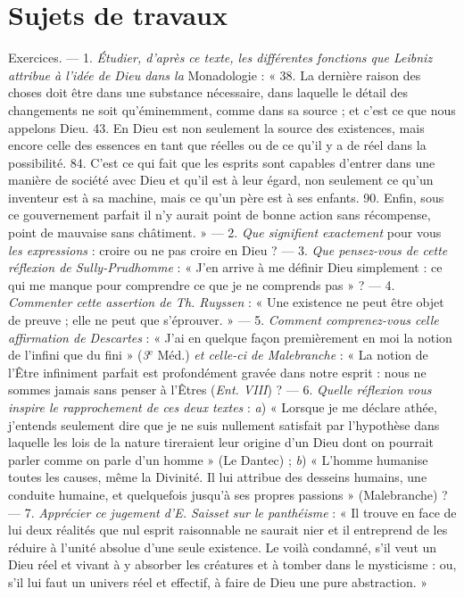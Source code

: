 \section{Sujets de travaux}%

Exercices. — 1. {\it Étudier, d'après ce texte, les différentes fonctions que
Leibniz attribue à l’idée de Dieu dans la} Monadologie : « 38. La dernière
raison des choses doit être dans une substance nécessaire, dans laquelle le
détail des changements ne soit qu’éminemment, comme dans sa source ; et
c’est ce que nous appelons Dieu. 43. En Dieu est non seulement la source
des existences, mais encore celle des essences en tant que réelles ou de ce
qu’il y a de réel dans la possibilité. 84. C’est ce qui fait que les esprits
sont capables d'entrer dans une manière de société avec Dieu et qu’il est à
leur égard, non seulement ce qu’un inventeur est à sa machine, mais ce
qu’un père est à ses enfants. 90. Enfin, sous ce gouvernement parfait il
n’y aurait point de bonne action sans récompense, point de mauvaise sans
châtiment. » — 2. {\it Que signifient exactement} pour vous {\it les expressions} : croire
ou ne pas croire en Dieu ? — 3. {\it Que pensez-vous de cette réflexion de Sully-Prudhomme} :
« J'en arrive à me définir Dieu simplement : ce qui me
manque pour comprendre ce que je ne comprends pas » ? — 4. {\it Commenter
cette assertion de Th. Ruyssen} : « Une existence ne peut être objet de preuve ;
elle ne peut que s’éprouver. » — 5. {\it Comment comprenez-vous celle affirmation
de Descartes} : « J'ai en quelque façon premièrement en moi la notion de
l'infini que du fini » ({\it 3$^\text{e}$} Méd.) {\it et celle-ci de Malebranche} : « La notion de
l'Être infiniment parfait est profondément gravée dans notre esprit : nous
ne sommes jamais sans penser à l’Êtres ({\it Ent. VIII}) ? — 6. {\it Quelle réflexion
vous inspire le rapprochement de ces deux textes} : {\it a}) « Lorsque je me déclare
athée, j'entends seulement dire que je ne suis nullement satisfait par
l'hypothèse dans laquelle les lois de la nature tireraient leur origine d’un
Dieu dont on pourrait parler comme on parle d’un homme » (Le Dantec) ;
{\it b}) « L'homme humanise toutes les causes, même la Divinité. Il lui attribue
des desseins humains, une conduite humaine, et quelquefois jusqu’à ses
propres passions » (Malebranche) ? — 7. {\it Apprécier ce jugement d'E. Saisset
sur le panthéisme} : « Il trouve en face de lui deux réalités que nul esprit
raisonnable ne saurait nier et il entreprend de les réduire à l'unité absolue
d’une seule existence. Le voilà condamné, s’il veut un Dieu réel et vivant
à y absorber les créatures et à tomber dans le mysticisme : ou, s’il lui faut
un univers réel et effectif, à faire de Dieu une pure abstraction. »

